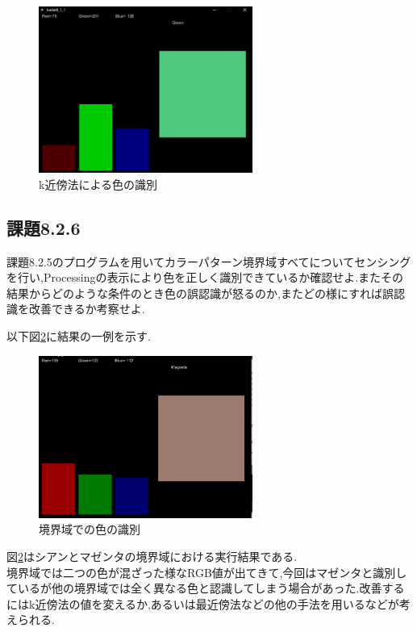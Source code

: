 \documentclass{jarticle}
\begin{document}
\begin{figure}[H]
\begin{center}
\includegraphics[width=7.0cm]{images/kadai8-2-5.png}
\caption{k近傍法による色の識別}
\label{fig:kadai8-2-5}
\end{center}
\end{figure}


\subsection{課題8.2.6}
課題8.2.5のプログラムを用いてカラーパターン境界域すべてについてセンシングを行い,Processingの表示により色を正しく識別できているか確認せよ.またその結果からどのような条件のとき色の誤認識が怒るのか,またどの様にすれば誤認識を改善できるか考察せよ.

以下図\ref{fig:kadai8-2-6}に結果の一例を示す.

\begin{figure}[H]
\begin{center}
\includegraphics[width=7.0cm]{images/kadai8-2-6-new.png}
\caption{境界域での色の識別}
\label{fig:kadai8-2-6}
\end{center}
\end{figure}

図\ref{fig:kadai8-2-6}はシアンとマゼンタの境界域における実行結果である.\\
境界域では二つの色が混ざった様なRGB値が出てきて,今回はマゼンタと識別しているが他の境界域では全く異なる色と認識してしまう場合があった.改善するにはk近傍法の値を変えるか,あるいは最近傍法などの他の手法を用いるなどが考えられる.
\end{document}
